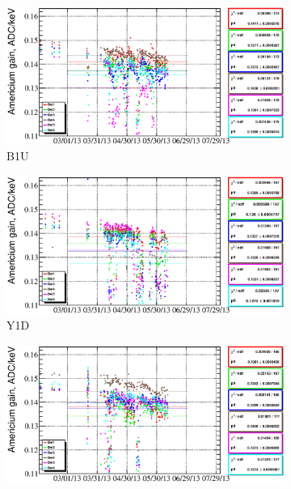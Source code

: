 \documentclass[a4paper,12pt]{article}
\begin{document}
\begin{figure}
%
\begin{subfigure}[t]{0.49\textwidth}
\includegraphics[width=\textwidth]{gfx/run13_alpha_study_novoltagevariation/B1U/c_chAmGain_by_day_B1U.eps}
\caption{B1U}
\end{subfigure}
%
\hfill
%
\begin{subfigure}[t]{0.49\textwidth}
\includegraphics[width=\textwidth]{gfx/run13_alpha_study_novoltagevariation/Y1D/c_chAmGain_by_day_Y1D.eps}
\caption{Y1D}
\end{subfigure}
%
\begin{subfigure}[t]{0.49\textwidth}
\includegraphics[width=\textwidth]{gfx/run13_alpha_study_novoltagevariation/B2D/c_chAmGain_by_day_B2D.eps}

\end{subfigure}
\end{figure}
\end{document}
